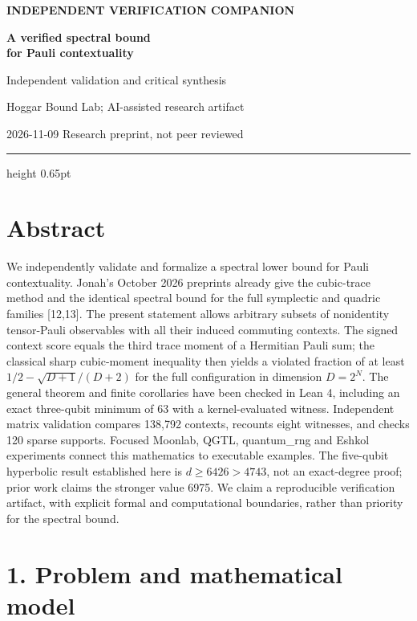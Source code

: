 \documentclass[11pt,letterpaper]{article}
\begin{document}
\thispagestyle{empty}
{\small\bfseries\color{Accent}INDEPENDENT VERIFICATION COMPANION}\par
\vspace{0.6em}
{\fontsize{22}{25}\selectfont\bfseries A verified spectral bound\\for Pauli contextuality}\par
\vspace{0.25em}
{\large\color{Accent}Independent validation and critical synthesis}\par
\vspace{0.8em}
{\normalsize Hoggar Bound Lab; AI-assisted research artifact}\par
{\small\color{Muted}2026-11-09 \quad\textbullet\quad Research preprint, not peer reviewed}\par
\vspace{0.6em}
{\color{Accent}\hrule height 0.65pt}
\vspace{0.5em}
\section{Abstract}\label{abstract}

We independently validate and formalize a spectral lower bound for Pauli contextuality. Jonah's October 2026 preprints already give the cubic-trace method and the identical spectral bound for the full symplectic and quadric families {[}12,13{]}. The present statement allows arbitrary subsets of nonidentity tensor-Pauli observables with all their induced commuting contexts. The signed context score equals the third trace moment of a Hermitian Pauli sum; the classical sharp cubic-moment inequality then yields a violated fraction of at least \(1/2-\sqrt{D+1}/(D+2)\) for the full configuration in dimension \(D=2^N\). The general theorem and finite corollaries have been checked in Lean 4, including an exact three-qubit minimum of 63 with a kernel-evaluated witness. Independent matrix validation compares 138,792 contexts, recounts eight witnesses, and checks 120 sparse supports. Focused Moonlab, QGTL, quantum\_rng and Eshkol experiments connect this mathematics to executable examples. The five-qubit hyperbolic result established here is \(d\ge6426>4743\), not an exact-degree proof; prior work claims the stronger value 6975. We claim a reproducible verification artifact, with explicit formal and computational boundaries, rather than priority for the spectral bound.

\section{1. Problem and mathematical model}\label{problem-and-mathematical-model}
\end{document}
